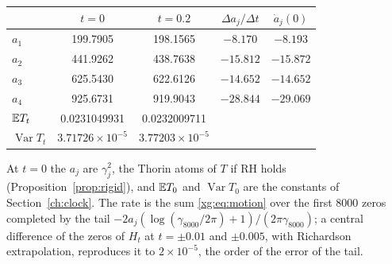 \begin{center}
\small
\begin{tabular}{lcccc}
\toprule
 & $t=0$ & $t=0.2$ & $\Delta a_j/\Delta t$ & $\dot a_j(0)$\\
\midrule
$a_1$ & 199.7905 & 198.1565 & $-8.170$ & $-8.193$\\
$a_2$ & 441.9262 & 438.7638 & $-15.812$ & $-15.872$\\
$a_3$ & 625.5430 & 622.6126 & $-14.652$ & $-14.652$\\
$a_4$ & 925.6731 & 919.9043 & $-28.844$ & $-29.069$\\
\midrule
$\mathbb{E} T_t$ & 0.0231049931 & 0.0232009711 & & \\
$\operatorname{Var}T_t$ & $3.71726\times10^{-5}$ & $3.77203\times10^{-5}$ & & \\
\bottomrule
\end{tabular}
\end{center}

At $t=0$ the $a_j$ are $\gamma_j^2$, the Thorin atoms of $T$ if RH holds (Proposition~\ref{prop:rigid}), and $\mathbb{E} T_0$ and $\operatorname{Var}T_0$ are the constants of Section~\ref{ch:clock}. The rate is the sum \eqref{xg:eq:motion} over the first $8000$ zeros completed by the tail $-2a_j(\log(\gamma_{8000}/2\pi)+1)/(2\pi\gamma_{8000})$; a central difference of the zeros of $H_t$ at $t=\pm0.01$ and $\pm0.005$, with Richardson extrapolation, reproduces it to $2\times10^{-5}$, the order of the error of the tail.

